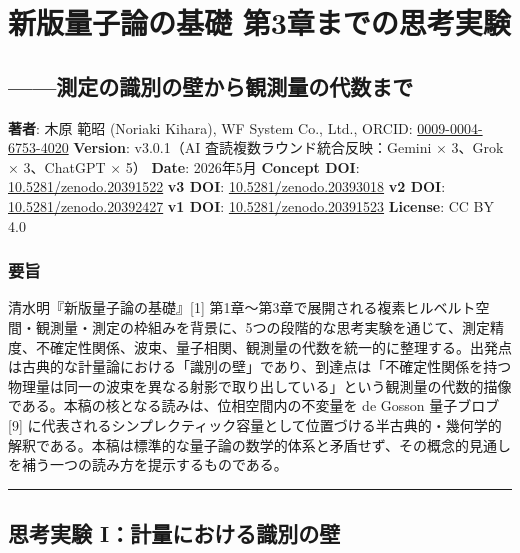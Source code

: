\documentclass[
  11pt,
]{ltjsarticle}
\author{}
\date{}
\begin{document}
\section{新版量子論の基礎
第3章までの思考実験}\label{ux65b0ux7248ux91cfux5b50ux8ad6ux306eux57faux790e-ux7b2c3ux7ae0ux307eux3067ux306eux601dux8003ux5b9fux9a13}

\subsection{------測定の識別の壁から観測量の代数まで}\label{ux6e2cux5b9aux306eux8b58ux5225ux306eux58c1ux304bux3089ux89b3ux6e2cux91cfux306eux4ee3ux6570ux307eux3067}

\textbf{著者}: 木原 範昭 (Noriaki Kihara), WF System Co., Ltd., ORCID:
\href{https://orcid.org/0009-0004-6753-4020}{0009-0004-6753-4020}
\textbf{Version}: v3.0.1（AI 査読複数ラウンド統合反映：Gemini × 3、Grok
× 3、ChatGPT × 5） \textbf{Date}: 2026年5月 \textbf{Concept DOI}:
\href{https://doi.org/10.5281/zenodo.20391522}{10.5281/zenodo.20391522}
\textbf{v3 DOI}:
\href{https://doi.org/10.5281/zenodo.20393018}{10.5281/zenodo.20393018}
\textbf{v2 DOI}:
\href{https://doi.org/10.5281/zenodo.20392427}{10.5281/zenodo.20392427}
\textbf{v1 DOI}:
\href{https://doi.org/10.5281/zenodo.20391523}{10.5281/zenodo.20391523}
\textbf{License}: CC BY 4.0

\subsubsection{要旨}\label{ux8981ux65e8}

清水明『新版量子論の基礎』{[}1{]}
第1章〜第3章で展開される複素ヒルベルト空間・観測量・測定の枠組みを背景に、5つの段階的な思考実験を通じて、測定精度、不確定性関係、波束、量子相関、観測量の代数を統一的に整理する。出発点は古典的な計量論における「識別の壁」であり、到達点は「不確定性関係を持つ物理量は同一の波束を異なる射影で取り出している」という観測量の代数的描像である。本稿の核となる読みは、位相空間内の不変量を
de Gosson 量子ブロブ {[}9{]}
に代表されるシンプレクティック容量として位置づける半古典的・幾何学的解釈である。本稿は標準的な量子論の数学的体系と矛盾せず、その概念的見通しを補う一つの読み方を提示するものである。

\begin{center}\rule{0.5\linewidth}{0.5pt}\end{center}

\subsection{思考実験
I：計量における識別の壁}\label{ux601dux8003ux5b9fux9a13-iux8a08ux91cfux306bux304aux3051ux308bux8b58ux5225ux306eux58c1}
\end{document}
